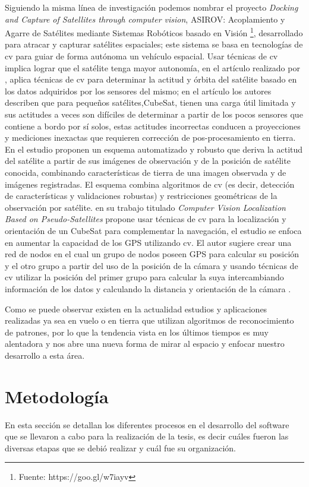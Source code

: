 Siguiendo la misma línea de investigación podemos nombrar el proyecto \textit{Docking and Capture of Satellites through computer vision}, ASIROV: Acoplamiento y Agarre de Satélites mediante Sistemas Robóticos basado en Visión \footnote{Fuente: https://goo.gl/w7iayv}, desarrollado para atracar y capturar satélites espaciales; este sistema se basa  en tecnologías de \ac{cv} para guiar de forma autónoma un vehículo espacial. Usar técnicas de \ac{cv} implica lograr que el satélite tenga mayor autonomía, en el artículo realizado por \cite{Kouyama}, aplica técnicas de \ac{cv} para determinar la actitud y órbita del satélite basado en los datos adquiridos por los sensores del mismo; en el artículo los autores describen que para pequeños satélites,CubeSat, tienen una carga útil limitada y sus actitudes a veces son difíciles de determinar a partir de los pocos sensores que contiene a bordo por sí solos, estas actitudes incorrectas conducen a proyecciones y mediciones inexactas que requieren corrección de pos-procesamiento en tierra. En el estudio proponen un esquema automatizado y robusto que deriva la actitud del satélite a partir de sus imágenes de observación y de la posición de satélite conocida, combinando características de tierra de una imagen observada y de imágenes registradas. El esquema combina algoritmos de \ac{cv} (es decir, detección de características y validaciones robustas) y restricciones geométricas de la observación por satélite. \cite{Huggins} en su trabajo titulado \textit{Computer Vision Localization Based on Pseudo-Satellites} propone usar técnicas de \ac{cv} para la localización y orientación de un CubeSat para complementar la navegación, el estudio se enfoca en  aumentar la capacidad de los GPS utilizando \ac{cv}. El autor sugiere crear una red de nodos en el cual un grupo de nodos poseen GPS para calcular su posición y el otro grupo a partir del uso de la posición de la cámara y usando técnicas de  \ac{cv}  utilizar la posición del primer grupo para calcular la suya intercambiando información de los datos y calculando la distancia y orientación de la cámara \citep{Huggins}. 

Como se puede observar existen en la actualidad estudios y aplicaciones realizadas ya sea en vuelo o en tierra que utilizan algoritmos de reconocimiento de patrones, por lo que la tendencia vista en los últimos tiempos es muy alentadora y nos abre una nueva forma de mirar al espacio y enfocar nuestro desarrollo a esta área.


\section{Metodología}\label{sec:metodologia}
En esta sección se detallan los diferentes procesos en el desarrollo del software que se llevaron a cabo para la realización de la tesis, es decir cuáles fueron las diversas etapas que se debió realizar y cuál fue su organización.

